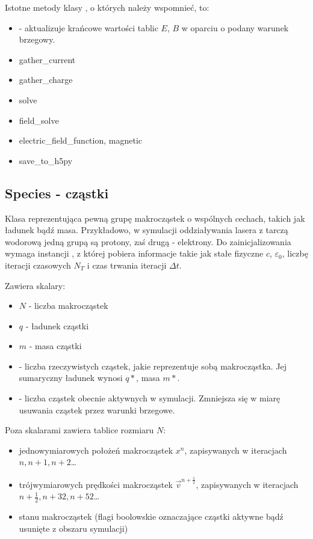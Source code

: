 Istotne metody klasy , o których należy wspomnieć, to:
\begin{itemize}
     \item {} - aktualizuje krańcowe wartości tablic $E$, $B$
         w oparciu o podany warunek brzegowy.
     \item gather\_current 
     \item gather\_charge
     \item solve
     \item field\_solve
     \item electric\_field\_function, magnetic
     \item save\_to\_h5py
\end{itemize}

\subsection{Species - cząstki}
Klasa reprezentująca pewną grupę makrocząstek o wspólnych cechach, takich
jak ładunek bądź masa.  Przykładowo, w symulacji oddziaływania lasera z
tarczą wodorową jedną grupą są protony, zaś drugą - elektrony.  Do
zainicjalizowania wymaga instancji , z której pobiera informacje
takie jak stałe fizyczne $c$, $\varepsilon_0$, liczbę iteracji czasowych
$N_T$ i czas trwania iteracji $\Delta t$.

Zawiera skalary:
\begin{itemize}
    \item $N$ - liczba makrocząstek
    \item $q$ - ładunek cząstki
    \item $m$ - masa cząstki
    \item {} - liczba rzeczywistych cząstek, jakie reprezentuje
        sobą makrocząstka. Jej sumaryczny ładunek wynosi $q *
        $, masa $m * $.
    \item {} - liczba cząstek obecnie aktywnych w symulacji.
        Zmniejsza się w miarę usuwania cząstek przez warunki brzegowe.
\end{itemize}

Poza skalarami zawiera tablice rozmiaru $N$:
\begin{itemize}
    \item jednowymiarowych położeń makrocząstek $x^n$, zapisywanych w
        iteracjach $n, n+1, n+2$\ldots
    \item trójwymiarowych prędkości makrocząstek $\vec{v}^{n+\frac{1}{2}}$,
        zapisywanych w iteracjach $n+\frac{1}{2}, n+{3}{2}, n+{5}{2}$\ldots
    \item stanu makrocząstek (flagi boolowskie oznaczające cząstki aktywne
        bądź usunięte z obszaru symulacji)
\end{itemize}

